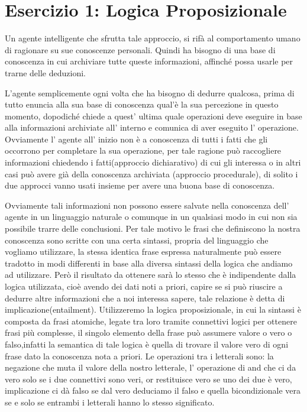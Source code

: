 \raggedright
{}
	\label{ch:cc}
	\section{Esercizio 1: Logica Proposizionale}
		\label{sec:es1}
		Un agente intelligente che sfrutta tale approccio, si rifà al comportamento umano di ragionare su sue conoscenze personali. Quindi ha bisogno di una base di conoscenza in cui archiviare tutte queste informazioni, affinché possa usarle per trarne delle deduzioni.
		\par
		L'agente semplicemente ogni volta che ha bisogno di dedurre qualcosa, prima di tutto enuncia alla sua base di conoscenza qual'è la sua percezione in questo momento, dopodiché chiede a quest' ultima quale operazioni deve eseguire in base alla informazioni archiviate all' interno e comunica  di aver eseguito l' operazione. Ovviamente l' agente all' inizio non è a conoscenza di tutti i fatti che gli occorrono per completare la sua operazione, per tale ragione può raccogliere informazioni chiedendo i fatti(approccio dichiarativo) di cui gli interessa o in altri casi può avere già della conoscenza archiviata (approccio procedurale), di solito i due approcci vanno usati insieme per avere una buona base di conoscenza.
		\par
		Ovviamente tali informazioni non possono essere salvate nella conoscenza dell' agente in un linguaggio naturale o comunque in un qualsiasi modo in cui non sia possibile trarre delle conclusioni. Per tale motivo le frasi che definiscono la nostra conoscenza sono scritte con una certa sintassi, propria del linguaggio che vogliamo utilizzare, la stessa identica frase espressa naturalmente può essere tradotto in modi differenti in base alla diversa sintassi della logica che andiamo ad utilizzare. Però il risultato da ottenere sarà lo stesso che è indipendente dalla logica utilizzata, cioè avendo dei dati noti a priori, capire se si può riuscire a dedurre altre informazioni che a noi interessa sapere, tale relazione è detta di implicazione(entailment). Utilizzeremo la logica proposizionale, in cui la sintassi è composta da frasi atomiche, legate tra loro tramite connettivi logici per ottenere frasi più complesse, il singolo elemento della frase può assumere valore o vero o falso,infatti la semantica di tale logica è quella di trovare il valore vero di ogni frase dato la conoscenza nota a priori. Le operazioni tra i letterali sono: la negazione che muta il valore della nostro letterale, l' operazione di and che ci da vero solo se i due connettivi sono veri, or restituisce vero se uno dei due è vero, implicazione ci dà falso se dal vero deduciamo il falso e quella bicondizionale vera se e solo se entrambi i letterali hanno lo stesso significato.
